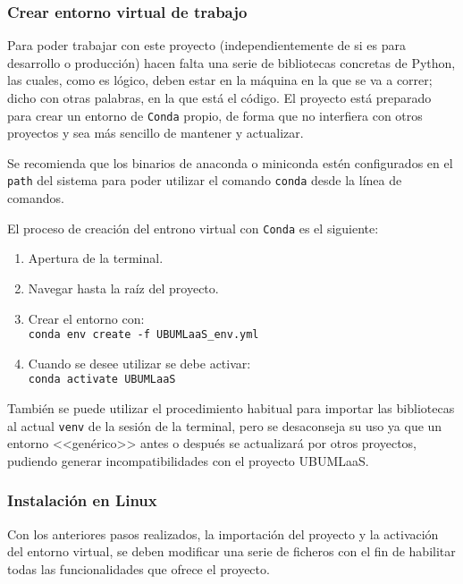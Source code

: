 \subsubsection{Crear entorno virtual de trabajo}
Para poder trabajar con este proyecto (independientemente de si es para desarrollo o producción) hacen falta una serie de bibliotecas concretas de Python, las cuales, como es lógico, deben estar en la máquina en la que se va a correr; dicho con otras palabras, en la que está el código. El proyecto está preparado para crear un entorno de \texttt{Conda} propio, de forma que no interfiera con otros proyectos y sea más sencillo de mantener y actualizar.

Se recomienda que los binarios de anaconda o miniconda estén configurados en el \texttt{path} del sistema para poder utilizar el comando \texttt{conda} desde la línea de comandos.

El proceso de creación del entrono virtual con \texttt{Conda} es el siguiente:
\begin{enumerate}
\tightlist
\item Apertura de la terminal.
\item Navegar hasta la raíz del proyecto.
\item Crear el entorno con:\\
\texttt{conda env create -f UBUMLaaS\_env.yml}
\item Cuando se desee utilizar se debe activar:\\
\texttt{conda activate UBUMLaaS}
\end{enumerate}

También se puede utilizar el procedimiento habitual para importar las bibliotecas al actual \texttt{venv} de la sesión de la terminal, pero se desaconseja su uso ya que un entorno <<genérico>> antes o después se actualizará por otros proyectos, pudiendo generar incompatibilidades con el proyecto UBUMLaaS.

\subsubsection{Instalación en Linux}
Con los anteriores pasos realizados, la importación del proyecto y la activación del entorno virtual, se deben modificar una serie de ficheros con el fin de habilitar todas las funcionalidades que ofrece el proyecto. 

